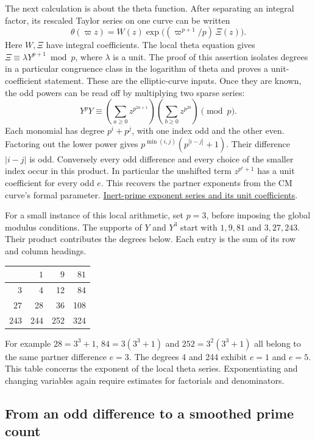\documentclass[11pt,letterpaper]{article}
\newcommand{\sref}[2]{\href{https://github.com/VladimirReshetnikov/ProveIt/blob/d8415e76ad850651f8c0083afe689dd9f4a45a10/Analysis/GeneralizedRiemannHypothesis/vendor/grh-lean/grh/src/#1.lean}{#2}}
\begin{document}
The next calculation is about the theta function. After separating an integral factor, its rescaled Taylor series on one curve can be written
\[
 \theta(\varpi z)=W(z)\exp\!\bigl((\varpi^{p+1}/p)\,\Xi(z)\bigr).
\]
Here \(W,\Xi\) have integral coefficients. The local theta equation gives \(\Xi\equiv\lambda Y^{p+1}\bmod p\), where \(\lambda\) is a unit. The proof of this assertion isolates degrees in a particular congruence class in the logarithm of theta and proves a unit-coefficient statement. These are the elliptic-curve inputs. Once they are known, the odd powers can be read off by multiplying two sparse series:
\[
    Y^pY\equiv
       \left(\sum_{a\ge0}z^{p^{2a+1}}\right)
       \left(\sum_{b\ge0}z^{p^{2b}}\right) \pmod p .
\]
Each monomial has degree \(p^i+p^j\), with one index odd and the other even. Factoring out the lower power gives \(p^{\min(i,j)}(p^{|i-j|}+1)\). Their difference \(|i-j|\) is odd. Conversely every odd difference and every choice of the smaller index occur in this product. In particular the unshifted term \(z^{p^e+1}\) has a unit coefficient for every odd \(e\). This recovers the partner exponents from the CM curve's formal parameter. \sref{New/Derivatives/FormalGroup/Exponent}{Inert-prime exponent series and its unit coefficients}.

For a small instance of this local arithmetic, set \(p=3\), before imposing the global modulus conditions. The supports of \(Y\) and \(Y^3\) start with \(1,9,81\) and \(3,27,243\). Their product contributes the degrees below. Each entry is the sum of its row and column headings.
\begin{center}\begin{tabular}{@{}r|rrr@{}}
\toprule
&\(1\)&\(9\)&\(81\)\\\midrule
\(3\)&4&12&84\\
\(27\)&28&36&108\\
\(243\)&244&252&324\\\bottomrule
\end{tabular}\end{center}
For example \(28=3^3+1\), \(84=3(3^3+1)\) and \(252=3^2(3^3+1)\) all belong to the same partner difference \(e=3\). The degrees 4 and 244 exhibit \(e=1\) and \(e=5\). This table concerns the exponent of the local theta series. Exponentiating and changing variables again require estimates for factorials and denominators.

\subsection{From an odd difference to a smoothed prime count}
\end{document}

